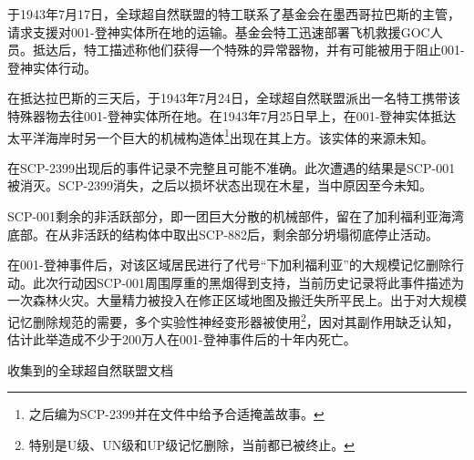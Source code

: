 于1943年7月17日，全球超自然联盟的特工联系了基金会在墨西哥拉巴斯的主管，请求支援对001-登神实体所在地的运输。基金会特工迅速部署飞机救援GOC人员。抵达后，特工描述称他们获得一个特殊的异常器物，并有可能被用于阻止001-登神实体行动。

在抵达拉巴斯的三天后，于1943年7月24日，全球超自然联盟派出一名特工携带该特殊器物去往001-登神实体所在地。在1943年7月25日早上，在001-登神实体抵达太平洋海岸时另一个巨大的机械构造体\footnote{之后编为SCP-2399并在文件中给予合适掩盖故事。}出现在其上方。该实体的来源未知。

在SCP-2399出现后的事件记录不完整且可能不准确。此次遭遇的结果是SCP-001被消灭。SCP-2399消失，之后以损坏状态出现在木星，当中原因至今未知。

SCP-001剩余的非活跃部分，即一团巨大分散的机械部件，留在了加利福利亚海湾底部。在从非活跃的结构体中取出SCP-882后，剩余部分坍塌彻底停止活动。

在001-登神事件后，对该区域居民进行了代号“下加利福利亚”的大规模记忆删除行动。此次行动因SCP-001周围厚重的黑烟得到支持，当前历史记录将此事件描述为一次森林火灾。大量精力被投入在修正区域地图及搬迁失所平民上。出于对大规模记忆删除规范的需要，多个实验性神经变形器被使用\footnote{特别是U级、UN级和UP级记忆删除，当前都已被终止。}，因对其副作用缺乏认知，估计此举造成不少于200万人在001-登神事件后的十年内死亡。

收集到的全球超自然联盟文档 \\

